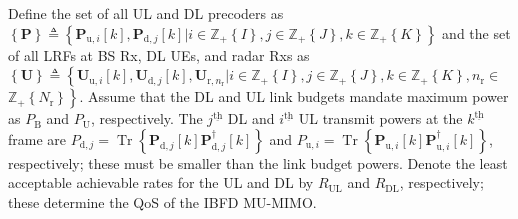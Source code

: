 \documentclass[10pt,journal]{IEEEtran}
\DeclareMathOperator{\trace}{Tr}
\newcommand{\bracket}[1]{{\left [{#1}\right ]}}
\newcommand{\braces}[1]{{\left\{ {#1}\right\}}}
\newcommand{\ith}[1]    {{#1}^{\underline{\text{th}}}}
\newcommand{\rr}{_\mathrm{r}}
\newcommand{\B}{\textrm{B}}
\newcommand{\rnr}{_{\mathrm{r},n_\mathrm{r}}}
\newcommand{\PiB}{\mathbf{P}_{\textrm{u},i}\bracket{k}}
\newcommand{\PiBH}{\mathbf{P}^\dagger_{\textrm{u},i}\bracket{k}}
\newcommand{\PBj}{\mathbf{P}_{\textrm{d},j}\bracket{k}}
\newcommand{\PBjH}{\mathbf{P}^\dagger_{\textrm{d},j}\bracket{k}}
\newcommand{\UiB}{\mathbf{U}_{\textrm{u},i}\bracket{k}}
\newcommand{\UBj}{\mathbf{U}_{\textrm{d},j}\bracket{k}}
\theoremstyle{definition}
\begin{document}
Define the set of all UL and DL precoders as %
$\braces{\mathbf{P}}\triangleq\braces{\PiB,\PBj | i\in\mathbb{Z}_+\braces{I}, j\in\mathbb{Z}_+\braces{J}, k\in\mathbb{Z}_+\braces{K}}$ 
and the set of all LRFs at BS Rx, DL UEs, and radar Rxs as 
$\braces{\mathbf{U}}\triangleq\left\lbrace\UiB, \UBj, \mathbf{U}\rnr | i\in\mathbb{Z}_+\braces{I}, j\in\mathbb{Z}_+\braces{J}, k\in\mathbb{Z}_+\braces{K},n\rr\in\right.$ $\left.\mathbb{Z}_+\braces{N\rr}\right\rbrace$. 
Assume that the DL and UL link budgets mandate maximum power as $\mathit{P}_\B$ and $\mathit{P}_{\textrm{U}}$, respectively. The $\ith{j}$ DL and $\ith{i}$ UL transmit powers at the $\ith{k}$ frame are $\mathit{P}_{\textrm{d},j}=\trace\braces{\PBj\PBjH}$ and $\mathit{P}_{\textrm{u},i}=\trace\braces{\PiB\PiBH}$, respectively; these must be smaller than the link budget powers. Denote the least acceptable achievable rates for the UL and DL by $\mathit{R}_{\textrm{UL}}$ and $\mathit{R}_{\textrm{DL}}$, respectively; these determine the QoS of the IBFD MU-MIMO.
\end{document}
